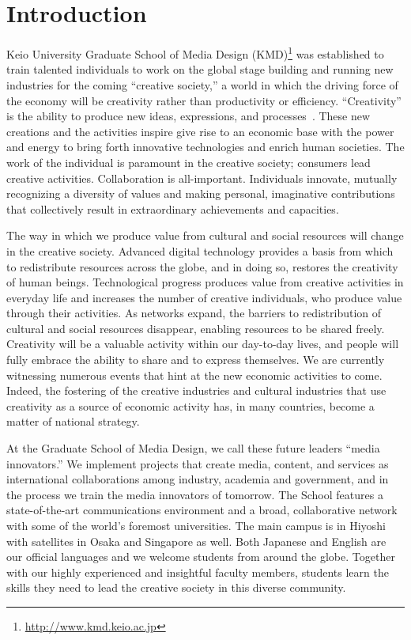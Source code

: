 
\chapter{Introduction}
\label{intro}

\makeendnotes

Keio University Graduate School of Media Design
(KMD)\footnote{\url{http://www.kmd.keio.ac.jp}} was established
to train talented individuals to work on the global stage building and
running new industries for the coming ``creative society,''
a world in which the driving force of the economy will be creativity
rather than productivity or efficiency.
``Creativity'' is the ability to produce new ideas, expressions,
and processes~\cite{Inakage2007}.
These new creations and the activities inspire give rise to
an economic base with the power and energy to bring forth innovative
technologies and enrich human societies.
The work of the individual is paramount in the creative society;
consumers lead creative activities.
Collaboration is all-important.
Individuals innovate, mutually recognizing a diversity of values
and making personal, imaginative contributions that collectively
result in extraordinary achievements and capacities.

The way in which we produce value from cultural and social resources
will change in the creative society.
Advanced digital technology provides a basis from which to redistribute
resources across the globe, and in doing so, restores the creativity of
human beings.
Technological progress produces value from creative activities
in everyday life and increases the number of creative individuals,
who produce value through their activities.
As networks expand, the barriers to redistribution of cultural and
social resources disappear, enabling resources to be shared freely.
Creativity will be a valuable activity within our day-to-day lives,
and people will fully embrace the ability to share and to express
themselves.
We are currently witnessing numerous events that hint
at the new economic activities to come.
Indeed, the fostering of the creative industries and cultural industries
that use creativity as a source of economic activity has,
in many countries, become a matter of national strategy.

At the Graduate School of Media Design, we call these future leaders
``media innovators.''
We implement projects that create media, content, and services
as international collaborations among industry, academia and government,
and in the process we train the media innovators of tomorrow.
The School features a state-of-the-art communications environment
and a broad, collaborative network
with some of the world's foremost universities.
The main campus is in Hiyoshi with satellites in Osaka and Singapore as well.
Both Japanese and English are our official languages and we welcome students
from around the globe.
Together with our highly experienced and insightful faculty members,
students learn the skills they need to lead the creative society
in this diverse community.

